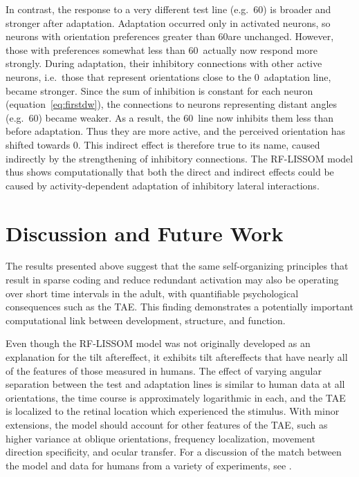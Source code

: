 \documentclass[10pt]{article}   %
\begin{document}
In contrast, the response to a very different test line (e.g.\ 60\degree)
is broader and stronger after adaptation.  Adaptation occurred only in
activated neurons, so neurons with orientation preferences greater
than 60\degree are unchanged.  However, those with preferences somewhat
less than 60\degree\ actually now respond more strongly.  During
adaptation, their inhibitory connections with other active neurons,
i.e.\ those that represent orientations close to the 0\degree\ adaptation line, became
stronger.  Since the sum of inhibition is constant for each neuron
(equation~\ref{eq:firstdw}), the connections to neurons representing
distant angles (e.g.\ 60\degree) became weaker.  As a result, the 60\degree\ 
line now inhibits them less than before adaptation.  Thus they are
more active, and the perceived orientation has shifted towards 0\degree.
This indirect effect is therefore true to its name, caused indirectly
by the strengthening of inhibitory connections.  The RF-LISSOM model
thus shows computationally that both the direct and indirect effects
could be caused by activity-dependent adaptation of inhibitory lateral
interactions. 


\section{Discussion and Future Work}


The results presented above suggest that the same self-organizing
principles that result in sparse coding and reduce redundant
activation may also be operating over short time intervals in the
adult, with quantifiable psychological consequences such as the TAE\@.
This finding demonstrates a potentially important computational link
between development, structure, and function.

Even though the RF-LISSOM model was not originally developed as an
explanation for the tilt aftereffect, it exhibits tilt aftereffects
that have nearly all of the features of those measured in humans.  The
effect of varying angular separation between the test and adaptation
lines is similar to human data at all orientations, the time course is
approximately logarithmic in each, and the TAE is localized to the
retinal location which experienced the stimulus.  With minor
extensions, the model should account for other features of the TAE,
such as higher variance at oblique orientations, frequency
localization, movement direction specificity, and ocular transfer.
For a discussion of the match between the model and data for humans
from a variety of experiments, see \emcite{bednar:aitr97}.
\end{document}
